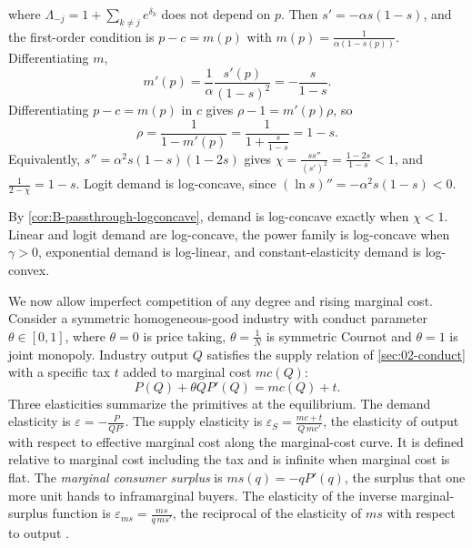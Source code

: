 \begin{example}
\begin{enumerate}[label=(\roman*)]
  where $\Lambda_{-j} = 1 + \sum_{k \neq j}e^{\delta_k}$ does not depend on $p$. Then $s' = -\alpha s(1 - s)$, and the
  first-order condition is $p - c = m(p)$ with $m(p) = \frac{1}{\alpha(1 - s(p))}$. Differentiating $m$,
  \begin{equation*}
  m'(p) = \frac{1}{\alpha}\frac{s'(p)}{(1 - s)^2} = -\frac{s}{1 - s} .
  \end{equation*}
  Differentiating $p - c = m(p)$ in $c$ gives $\rho - 1 = m'(p)\rho$, so
  \begin{equation*}
  \rho = \frac{1}{1 - m'(p)} = \frac{1}{1 + \frac{s}{1 - s}} = 1 - s .
  \end{equation*}
  Equivalently, $s'' = \alpha^2s(1 - s)(1 - 2s)$ gives $\chi = \frac{ss''}{(s')^2} = \frac{1 - 2s}{1 - s} < 1$, and
  $\frac{1}{2 - \chi} = 1 - s$. Logit demand is log-concave, since $(\ln s)'' = -\alpha^2s(1 - s) < 0$.
\end{enumerate}
\end{example}

By \cref{cor:B-passthrough-logconcave}, demand is log-concave exactly when $\chi < 1$. Linear and logit demand
are log-concave, the power family is log-concave when $\gamma > 0$, exponential demand is log-linear, and
constant-elasticity demand is log-convex.

We now allow imperfect competition of any degree and rising marginal cost. Consider a symmetric homogeneous-good
industry with conduct parameter $\theta \in [0, 1]$, where $\theta = 0$ is price taking, $\theta = \frac{1}{N}$ is symmetric
Cournot and $\theta = 1$ is joint monopoly. Industry output $Q$ satisfies the supply relation of \cref{sec:02-conduct}
with a specific tax $t$ added to marginal cost $mc(Q)$:
\begin{equation}\label{eq:B-supply-relation}
P(Q) + \theta QP'(Q) = mc(Q) + t .
\end{equation}
Three elasticities summarize the primitives at the equilibrium. The demand elasticity is
$\varepsilon = -\frac{P}{QP'}$. The supply elasticity is $\varepsilon_S = \frac{mc + t}{Q\,mc'}$, the elasticity of output
with respect to effective marginal cost along the marginal-cost curve. It is defined relative to marginal cost including
the tax and is infinite when marginal cost is flat. The \emph{marginal consumer surplus} is $ms(q) = -qP'(q)$, the surplus
that one more unit hands to inframarginal buyers. The elasticity of the inverse marginal-surplus function is
$\varepsilon_{ms} = \frac{ms}{q\,ms'}$, the reciprocal of the elasticity of $ms$ with respect to output
\citep[p.~539]{WeylFabinger2013}.

